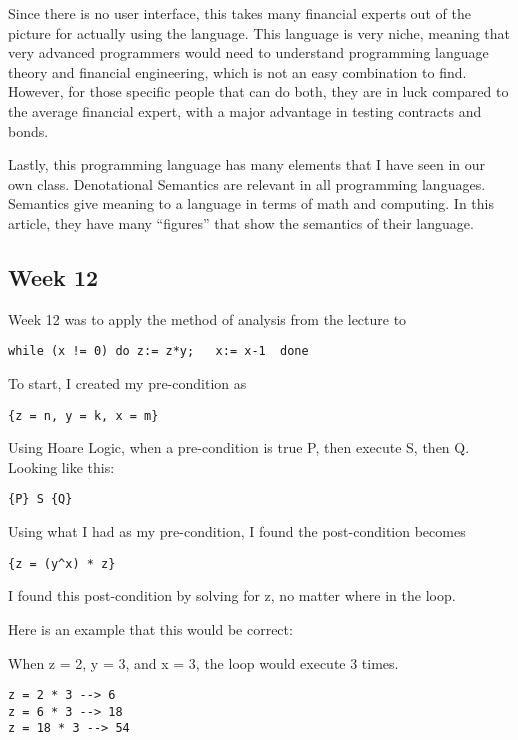 \documentclass{article}
\theoremstyle{theorem}
\theoremstyle{definition}
\theoremstyle{remark}
\begin{document}
\noindent\newline Since there is no user interface, this takes many financial experts out of the picture for actually using the language. This language is very niche, meaning that very advanced programmers would need to understand programming language theory and financial engineering, which is not an easy combination to find. However, for those specific people that can do both, they are in luck compared to the average financial expert, with a major advantage in testing contracts and bonds.

\noindent\newline Lastly, this programming language has many elements that I have seen in our own class. Denotational Semantics are relevant in all programming languages. Semantics give meaning to a language in terms of math and computing. In this article, they have many “figures” that show the semantics of their language.

\subsection{Week 12}
Week 12 was to apply the method of analysis from the lecture to
\begin{verbatim}
while (x != 0) do z:= z*y;   x:= x-1  done
\end{verbatim}

\noindent\newline\newline To start, I created my pre-condition as
\begin{verbatim}
{z = n, y = k, x = m}
\end{verbatim}

\noindent Using Hoare Logic, when a pre-condition is true P, then execute S, then Q.
\noindent Looking like this:
\begin{verbatim}
{P} S {Q}
\end{verbatim}

\noindent\newline\newline Using what I had as my pre-condition, I found the post-condition becomes
\begin{verbatim}
{z = (y^x) * z}
\end{verbatim}

\noindent I found this post-condition by solving for z, no matter where in the loop.

\noindent Here is an example that this would be correct:

\noindent When z = 2, y = 3, and x = 3, the loop would execute 3 times. 
\begin{verbatim}
z = 2 * 3 --> 6
z = 6 * 3 --> 18
z = 18 * 3 --> 54
\end{verbatim} 
\end{document}
